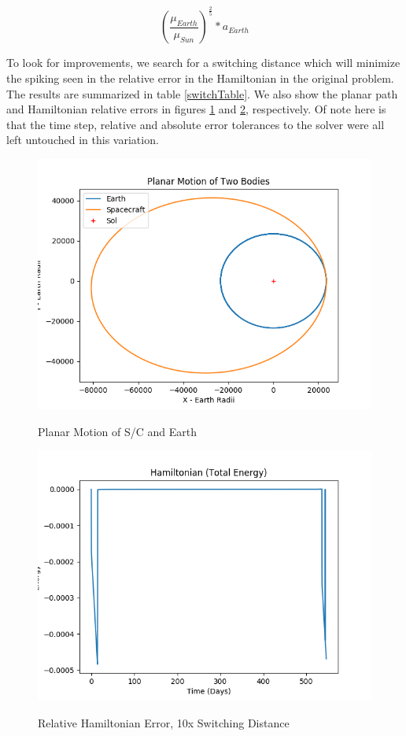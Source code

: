 \documentclass[11pt,twoside,letterpaper]{article}
\begin{document}
  \begin{equation}
    \left(\frac{\mu_{Earth}}{\mu_{Sun}}\right)^{\frac{2}{5}}*a_{Earth}
  \end{equation}
  
  To look for improvements, we search for a switching distance which
  will minimize the spiking seen in the relative error in the
  Hamiltonian in the original problem. The results are summarized in
  table \ref{switchTable}. We also show the planar path and
  Hamiltonian relative errors in figures \ref{kspath10} and
  \ref{ksham10}, respectively. Of note here is that the time step,
  relative and absolute error tolerances to the solver were all left
  untouched in this variation. 

  \begin{figure}
    \caption{Planar Motion of S/C and Earth}
    \centering
    \includegraphics[scale=0.5]{PlanarPath}
    \label{kspath10}
  \end{figure}

  \begin{figure}
    \caption{Relative Hamiltonian Error, 10x Switching Distance}
    \centering
    \includegraphics[scale=0.5]{Hamiltonian}
    \label{ksham10}
  \end{figure}
\end{document}
